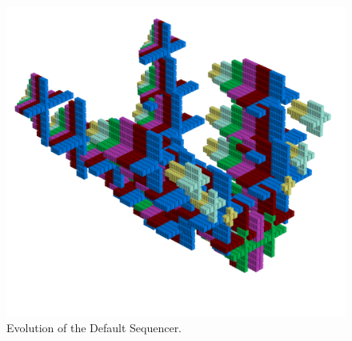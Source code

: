 \clearpage                                                                 
\begin{figure}[H]                                                          
    \centering                                                             
    \begin{adjustbox}{width=17cm,center}                                   
      \includegraphics[width=14cm]{src/sequencer/pattern0-45.png}%
    \end{adjustbox}                                                        
\caption{Evolution of the Default Sequencer.}                                           
\end{figure}                                                               
\clearpage                                                                 
                                                                           

